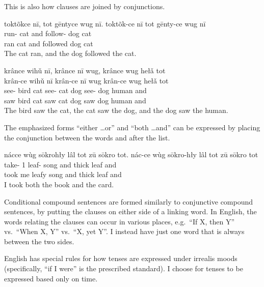 \documentclass[12pt]{article}
\begin{document}
    This is also how clauses are joined by conjunctions.

    \begin{exe}
        \ex
        \glt
        toktõkce nī, tot gēntyce wug nī.
        \glll
        toktõk-ce nī tot gēnty-ce wug nī \\
        run-\Pst{} cat and follow-\Pst{} dog cat \\
        ran cat and followed dog cat \\
        \glt
        The cat ran, and the dog followed the cat.
    \end{exe}

    \begin{exe}
        \ex
        \glt
        krânce wihǔ nī, krânce nī wug, krânce wug hełǎ tot \\
        \glll
        krân-ce wihǔ nī krân-ce nī wug krân-ce wug hełǎ tot \\
        see-\Pst{} bird cat see-\Pst{} cat dog see-\Pst{} dog human and \\
        saw bird cat saw cat dog saw dog human and \\
        \glt
        The bird saw the cat, the cat saw the dog, and the dog saw the human.
    \end{exe}

    The emphasized forms ``either \dots or''
    and ``both \dots and''
    can be expressed by placing the conjunction between the words and after the list.

    \begin{exe}
        \ex
        \glt
        nácce wùg sōkrohły lâl tot zū sōkro tot.
        \glll
        nác-ce wùg sōkro-hły lâl tot zū sōkro tot \\
        take-\Pst{} 1\Sg{} leaf-\Adj{} song and thick leaf and \\
        took me leafy song and thick leaf and \\
        \glt
        I took both the book and the card.
    \end{exe}

    Conditional compound sentences are formed
    similarly to conjunctive compound sentences,
    by putting the clauses on either side of a linking word.
    In English, the words relating the clauses can occur in various places,
    e.g.\ ``If X, then Y'' vs.\ ``When X, Y'' vs.\ ``X, yet Y''.
    I instead have just one word that is always between the two sides.

    English has special rules for how tenses are expressed under irrealis moods
    (specifically, ``if I were'' is the prescribed standard).
    I choose for tenses to be expressed based only on time.
\end{document}
